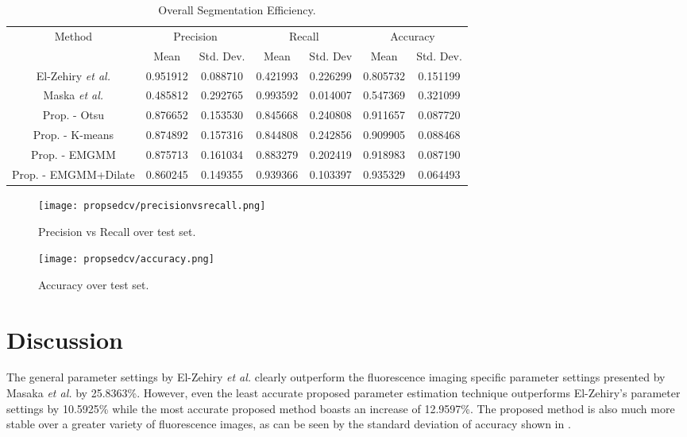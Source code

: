 \begin{longtable}{|c|c|c|c|c|c|c|}
	\caption{Overall Segmentation Efficiency.} \label{tab:overallsegmentationefficiency}\\
	\hline 
	\multirow{2}{*}{Method} & \multicolumn{2}{c|}{Precision} & \multicolumn{2}{c|}{Recall} & \multicolumn{2}{c|}{Accuracy}  \\ 
	\hhline{~------}
	& Mean & Std. Dev. & Mean & Std. Dev & Mean & Std. Dev.  \\ 
	\hline	El-Zehiry \textit{et al.}	&	0.951912	&	0.088710	&	0.421993	&	0.226299	&	0.805732	&	0.151199	\\
	\hline \rowcolor{bad}	Maska \textit{et al.}	&	0.485812	&	0.292765	&	0.993592	&	0.014007	&	0.547369	&	0.321099\\
	\hline	Prop. - Otsu	&	0.876652	&	0.153530	&	0.845668	&	0.240808	&	0.911657	&	0.087720	\\
	\hline	Prop. - K-means	&	0.874892	&	0.157316	&	0.844808	&	0.242856	&	0.909905	&	0.088468	\\
	\hline	Prop. - EMGMM	&	0.875713	&	0.161034	&	0.883279	&	0.202419	&	0.918983	&	0.087190	\\
	\hline \rowcolor{closest}	Prop. - EMGMM+Dilate	&	0.860245	&	0.149355	&	0.939366	&	0.103397	&	0.935329	&	0.064493	\\
	\hline
\end{longtable} 

\begin{figure}[!h]
	\centering
	\texttt{[image: propsedcv/precisionvsrecall.png]}
	\caption{Precision vs Recall over test set.}
	\label{fig:precisionvsrecall}
\end{figure}

\begin{figure}[!t]
	\centering
	\texttt{[image: propsedcv/accuracy.png]}
	\caption{Accuracy over test set.}
	\label{fig:accuracyovertestset}
\end{figure}

\section{Discussion}
\label{sec:cvgc_discussion}

The general parameter settings by El-Zehiry \textit{et al.} clearly outperform the fluorescence imaging specific parameter settings presented by Masaka \textit{et al.} by 25.8363\%. However, even the least accurate proposed parameter estimation technique outperforms El-Zehiry's parameter settings by 10.5925\% while the most accurate proposed method boasts an increase of 12.9597\%. The proposed method is also much more stable over a greater variety of fluorescence images, as can be seen by the standard deviation of accuracy shown in .


